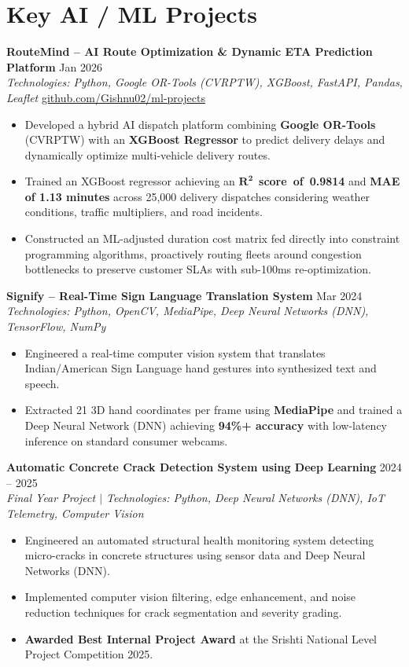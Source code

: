 \documentclass[letterpaper,9.5pt]{article}
\newcommand{\resumeItem}[1]{
  \item\small{
    {#1 \vspace{-2.5pt}}
  }
}
\begin{document}
\section{Key AI / ML Projects}

  \textbf{RouteMind -- AI Route Optimization \& Dynamic ETA Prediction Platform} \hfill Jan 2026 \\
  \textit{\small Technologies: Python, Google OR-Tools (CVRPTW), XGBoost, FastAPI, Pandas, Leaflet} \hfill \href{https://github.com/Gishnu02/ml-projects}{\color{NavyBlue}\small github.com/Gishnu02/ml-projects}
  \begin{itemize}
    \resumeItem{Developed a hybrid AI dispatch platform combining \textbf{Google OR-Tools} (CVRPTW) with an \textbf{XGBoost Regressor} to predict delivery delays and dynamically optimize multi-vehicle delivery routes.}
    \resumeItem{Trained an XGBoost regressor achieving an \mbox{$\mathbf{R^2}$ \textbf{score of 0.9814}} and \textbf{MAE of 1.13 minutes} across 25,000 delivery dispatches considering weather conditions, traffic multipliers, and road incidents.}
    \resumeItem{Constructed an ML-adjusted duration cost matrix fed directly into constraint programming algorithms, proactively routing fleets around congestion bottlenecks to preserve customer SLAs with sub-100ms re-optimization.}
  \end{itemize}

  \vspace{2pt}
  \textbf{Signify -- Real-Time Sign Language Translation System} \hfill Mar 2024 \\
  \textit{\small Technologies: Python, OpenCV, MediaPipe, Deep Neural Networks (DNN), TensorFlow, NumPy}
  \begin{itemize}
    \resumeItem{Engineered a real-time computer vision system that translates Indian/American Sign Language hand gestures into synthesized text and speech.}
    \resumeItem{Extracted 21 3D hand coordinates per frame using \textbf{MediaPipe} and trained a Deep Neural Network (DNN) achieving \textbf{94\%+ accuracy} with low-latency inference on standard consumer webcams.}
  \end{itemize}

  \vspace{2pt}
  \textbf{Automatic Concrete Crack Detection System using Deep Learning} \hfill 2024 -- 2025 \\
  \textit{\small Final Year Project $|$ Technologies: Python, Deep Neural Networks (DNN), IoT Telemetry, Computer Vision}
  \begin{itemize}
    \resumeItem{Engineered an automated structural health monitoring system detecting micro-cracks in concrete structures using sensor data and Deep Neural Networks (DNN).}
    \resumeItem{Implemented computer vision filtering, edge enhancement, and noise reduction techniques for crack segmentation and severity grading.}
    \resumeItem{\textbf{Awarded Best Internal Project Award} at the Srishti National Level Project Competition 2025.}
  \end{itemize}
\vspace{-2pt}
\end{document}
